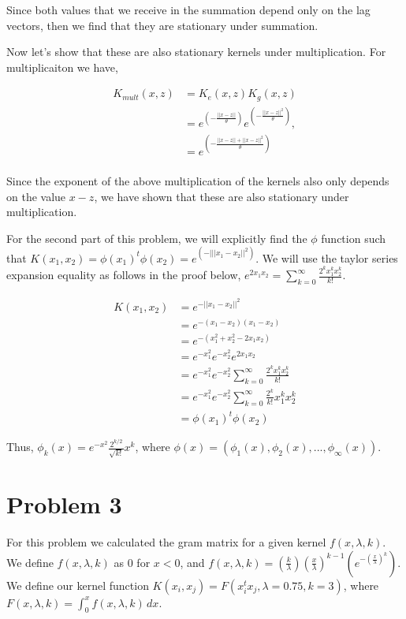 \documentclass[paper=a4, fontsize=11pt]{scrartcl} %
\begin{document}
Since both values that we receive in the summation depend only on the lag vectors, then we find that they are stationary under summation.

Now let's show that these are also stationary kernels under multiplication.  For multiplicaiton we have,

\begin{align}
K_{mult}(x,z) &= K_e(x,z)K_g(x,z) \\
&= e^{(-\frac{||x-z||}{\theta})}e^{(-\frac{||x-z||^2}{\theta})}, \\
&=  e^{(-\frac{||x-z||+||x-z||^2}{\theta})}\\
\end{align}

Since the exponent of the above multiplication of the kernels also only depends on the value $x-z$, we have shown that these are also stationary under multiplication.

For the second part of this problem, we will explicitly find the $\phi$ function such that $K(x_1,x_2) = \phi(x_1)^t\phi(x_2) =  e^{(-|||x_1-x_2||^2)}$.  We will use the taylor series expansion equality as follows in the proof below, $e^{2x_1x_2} = \sum \limits_{k=0}^\infty \frac{2^kx_1^kx_2^k}{k!}$. 

\begin{align}
K(x_1,x_2) &= e^{-||x_1-x_2||^2} \\
&= e^{-(x_1-x_2)(x_1-x_2)}\\
&= e^{-(x_1^{2} + x_2^{2} - 2x_1x_2)} \\
&= e^{-x_1^{2}}e^{-x_2^{2}}e^{2x_1x_2} \\
&= e^{-x_1^{2}}e^{-x_2^{2}} \sum \limits_{k=0}^\infty \frac{2^kx_1^kx_2^k}{k!} \\
&= e^{-x_1^{2}}e^{-x_2^{2}}\sum \limits_{k=0}^\infty \frac{2^{k}}{k!}x_1^kx_2^k \\
&= \phi(x_1)^t\phi(x_2)
\end{align}

Thus, $\phi_k(x) = e^{-x^2}\frac{2^{k/2}}{\sqrt{k!}}x^k$, where $\phi(x) = (\phi_1(x),\phi_2(x),...,\phi_\infty(x))$.

\section{Problem 3}

For this problem we calculated the gram matrix for a given kernel $f(x,\lambda,k)$.
We define $f(x,\lambda,k)$ as $0$ for $x < 0$, and $f(x,\lambda,k)=(\frac{k}{\lambda})(\frac{x}{\lambda})^{k-1}(e^{-(\frac{x}{\lambda})^k})$.
We define our kernel function $K(x_i,x_j) = F(x_i^tx_j,\lambda=0.75,k=3)$, where $F(x,\lambda,k) =\int^x_0 f(x,\lambda,k)\,dx$. 
\end{document}
